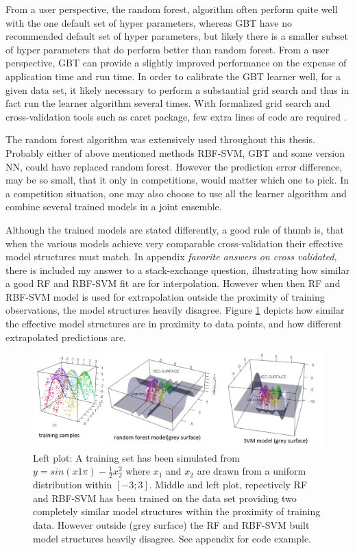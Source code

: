 From a user perspective, the random forest, algorithm often perform quite well with the one default set of hyper parameters, whereas GBT have no recommended default set of hyper parameters, but likely there is a smaller subset of hyper parameters that do perform better than random forest. From a user perspective, GBT can provide a slightly improved performance on the expense of application time and run time. In order to calibrate the GBT learner well, for a given data set, it likely necessary to perform a substantial grid search and thus in fact run the learner algorithm several times. With formalized grid search and cross-validation tools such as caret package, few extra lines of code are required \cite{kuhn2015short}.

The random forest algorithm was extensively used throughout this thesis. Probably either of above mentioned methods RBF-SVM, GBT and some version NN, could have replaced random forest. However the prediction error difference, may be so small, that it only in competitions, would matter which one to pick. In a competition situation, one may also choose to use all the learner algorithm and combine several trained models in a joint ensemble. 

Although the trained models are stated differently, a good rule of thumb is, that when the various models achieve very comparable cross-validation their effective model structures must match. In appendix \textit{favorite answers on cross validated}, there is included my answer to a stack-exchange question, illustrating how similar a good RF and RBF-SVM fit are for interpolation. However when then RF and RBF-SVM model is used for extrapolation outside the proximity of training observations, the model structures heavily disagree. Figure \ref{svmVSrf} depicts how similar the effective model structures are in proximity to data points, and how different extrapolated predictions are.

\begin{figure}[!htbp]
\includegraphics[width=\textwidth,height=\textheight,keepaspectratio]{graphics/svmVSrf.png}
\caption{Left plot: A training set has been simulated from  $y = sin(x1 \pi) − \frac 1 2 x_2^2$ where $x_1$ and $x_2$ are drawn from a uniform distribution within $[-3;3]$. Middle and left plot, repectively RF and RBF-SVM has been trained on the data set providing two completely similar model structures within the proximity of training data. However outside (grey surface) the RF and RBF-SVM built model structures heavily disagree. See appendix for code example.}
\label{svmVSrf}
\end{figure}


